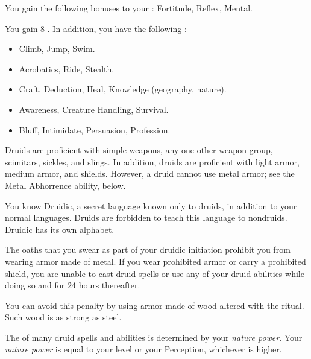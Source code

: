         You gain the following bonuses to your :  Fortitude,  Reflex,  Mental.

        You gain 8 .
        In addition, you have the following :
        \begin{itemize}
            \item {} Climb, Jump, Swim.
            \item {} Acrobatics, Ride, Stealth.
            \item {} Craft, Deduction, Heal, Knowledge (geography, nature).
            \item {} Awareness, Creature Handling, Survival.
            \item {} Bluff, Intimidate, Persuasion, Profession.
        \end{itemize}

        Druids are proficient with simple weapons, any one other weapon group, scimitars, sickles, and slings.
        In addition, druids are proficient with light armor, medium armor, and shields.
        However, a druid cannot use metal armor; see the Metal Abhorrence ability, below.

        You know Druidic, a secret language known only to druids, in addition to your normal languages.
        Druids are forbidden to teach this language to nondruids.
        Druidic has its own alphabet.

        The oaths that you swear as part of your druidic initiation prohibit you from wearing armor made of metal.
        If you wear prohibited armor or carry a prohibited shield, you are unable to cast druid spells or use any of your  druid abilities while doing so and for 24 hours thereafter.

        You can avoid this penalty by using armor made of wood altered with the  ritual.
        Such wood is as strong as steel.

        The  of many druid spells and abilities is determined by your \textit{nature power}.
        Your \textit{nature power} is equal to your level or your Perception, whichever is higher.

